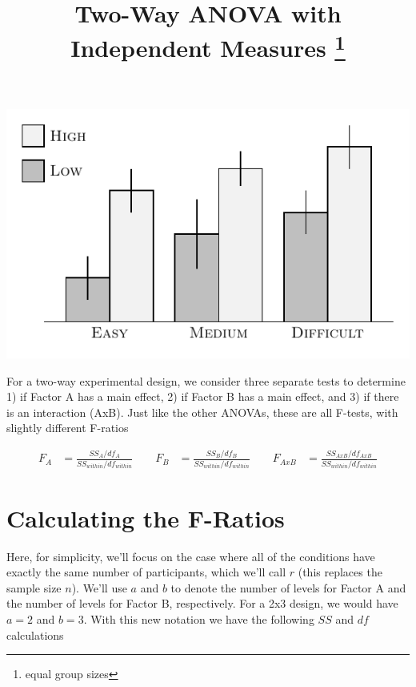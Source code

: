 \documentclass{tufte-handout}
\title{Two-Way ANOVA with Independent Measures \thanks{equal group sizes}}
\date{} %
\begin{document}
\maketitle%



\begin{marginfigure}[190pt]
  \includegraphics[width=\linewidth]{anova_data_two-way}%
  \label{fig:fullfig}%
\end{marginfigure}

For a two-way experimental design, we consider three separate tests to determine 1) if Factor A has a main effect, 2) if Factor B has a main effect, and 3) if there is an interaction (AxB). Just like the other ANOVAs, these are all F-tests, with slightly different F-ratios

\begin{align*}
F_A&=\frac{SS_A/df_A}{SS_{within}/df_{within}} \qquad
F_B&=\frac{SS_B/df_B}{SS_{within}/df_{within}} \qquad
F_{AxB} &= \frac{SS_{AxB}/df_{AxB}}{SS_{within}/df_{within}}
\end{align*}

\section{Calculating the F-Ratios}
Here, for simplicity, we'll focus on the case where all of the conditions have exactly the same number of participants, which we'll call $r$  (this replaces the sample size $n$). We'll use $a$  and $b$ to denote the number of levels for Factor A and the number of levels for Factor B, respectively. For a 2x3 design, we would have  $a=2$ and $b=3$. With this new notation we have the following $SS$ and $df$ calculations
\end{document}
